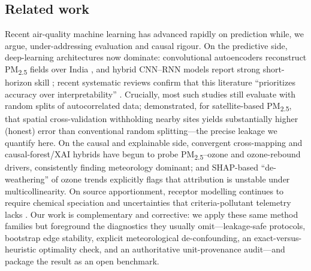 \subsection{Related work}
Recent air-quality machine learning has advanced rapidly on prediction while, we
argue, under-addressing evaluation and causal rigour. On the predictive side,
deep-learning architectures now dominate: convolutional autoencoders reconstruct
PM\textsubscript{2.5} fields over India \citep{rautela2024}, and hybrid CNN--RNN models
report strong short-horizon skill \citep{utku2025}; recent systematic reviews confirm
that this literature ``prioritizes accuracy over interpretability''
\citep{malhotra2024}. Crucially, most such studies still evaluate with random splits of
autocorrelated data; \citet{just2020} demonstrated, for satellite-based
PM\textsubscript{2.5}, that spatial cross-validation withholding nearby sites yields
substantially higher (honest) error than conventional random splitting---the precise
leakage we quantify here. On the causal and explainable side, convergent cross-mapping
\citep{qi2024} and causal-forest/XAI hybrids \citep{wang2025} have begun to probe
PM\textsubscript{2.5}--ozone and ozone-rebound drivers, consistently finding meteorology
dominant; and SHAP-based ``de-weathering'' of ozone trends \citep{ye2026} explicitly
flags that attribution is unstable under multicollinearity. On source apportionment,
receptor modelling continues to require chemical speciation and uncertainties that
criteria-pollutant telemetry lacks \citep{lakra2024,paatero1994pmf}. Our work is
complementary and corrective: we apply these same method families but foreground the
diagnostics they usually omit---leakage-safe protocols, bootstrap edge stability,
explicit meteorological de-confounding, an exact-versus-heuristic optimality check, and
an authoritative unit-provenance audit---and package the result as an open benchmark.

